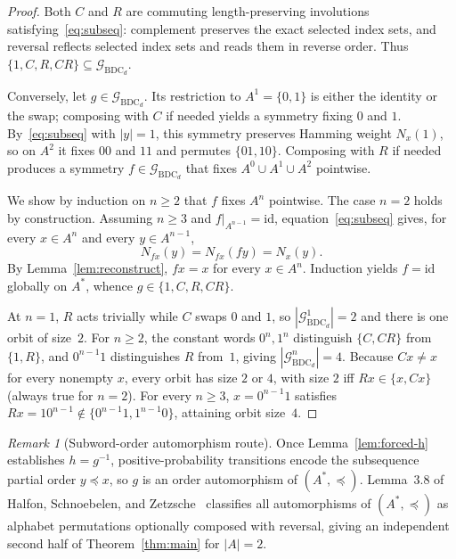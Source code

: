 \documentclass[11pt]{article}
\theoremstyle{plain}
\theoremstyle{definition}
\theoremstyle{remark}
\newtheorem{remark}{Remark}
\DeclareMathOperator{\BDC}{BDC}
\begin{document}
\begin{proof}
Both $C$ and $R$ are commuting length-preserving involutions satisfying~\eqref{eq:subseq}: complement preserves the exact selected index sets, and reversal reflects selected index sets and reads them in reverse order. Thus $\{1, C, R, CR\} \subseteq \mathcal{G}_{\BDC_d}$.

Conversely, let $g \in \mathcal{G}_{\BDC_d}$. Its restriction to $A^1 = \{0, 1\}$ is either the identity or the swap; composing with $C$ if needed yields a symmetry fixing $0$ and $1$. By~\eqref{eq:subseq} with $|y| = 1$, this symmetry preserves Hamming weight $N_x(1)$, so on $A^2$ it fixes $00$ and $11$ and permutes $\{01, 10\}$. Composing with $R$ if needed produces a symmetry $f \in \mathcal{G}_{\BDC_d}$ that fixes $A^0 \cup A^1 \cup A^2$ pointwise.

We show by induction on $n \ge 2$ that $f$ fixes $A^n$ pointwise. The case $n = 2$ holds by construction. Assuming $n \ge 3$ and $f|_{A^{n-1}} = \mathrm{id}$, equation~\eqref{eq:subseq} gives, for every $x \in A^n$ and every $y \in A^{n-1}$,
\[
N_{fx}(y) = N_{fx}(fy) = N_x(y).
\]
By Lemma~\ref{lem:reconstruct}, $fx = x$ for every $x \in A^n$. Induction yields $f = \mathrm{id}$ globally on $A^*$, whence $g \in \{1, C, R, CR\}$.

At $n = 1$, $R$ acts trivially while $C$ swaps $0$ and $1$, so $|\mathcal{G}_{\BDC_d}^1| = 2$ and there is one orbit of size~$2$. For $n \ge 2$, the constant words $0^n, 1^n$ distinguish $\{C, CR\}$ from $\{1, R\}$, and $0^{n-1}1$ distinguishes $R$ from~$1$, giving $|\mathcal{G}_{\BDC_d}^n| = 4$. Because $Cx \neq x$ for every nonempty $x$, every orbit has size $2$ or $4$, with size $2$ iff $Rx \in \{x, Cx\}$ (always true for $n = 2$). For every $n \ge 3$, $x = 0^{n-1}1$ satisfies $Rx = 10^{n-1} \notin \{0^{n-1}1, 1^{n-1}0\}$, attaining orbit size~$4$.
\end{proof}

\begin{remark}[Subword-order automorphism route]
Once Lemma~\ref{lem:forced-h} establishes $h = g^{-1}$, positive-probability transitions encode the subsequence partial order $y \preceq x$, so $g$ is an order automorphism of $(A^*, \preceq)$. Lemma~3.8 of Halfon, Schnoebelen, and Zetzsche~\cite{halfon2017} classifies all automorphisms of $(A^*, \preceq)$ as alphabet permutations optionally composed with reversal, giving an independent second half of Theorem~\ref{thm:main} for $|A| = 2$.
\end{remark}
\end{document}
